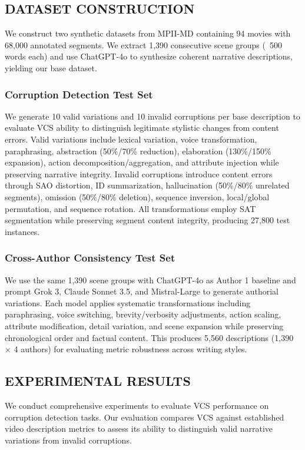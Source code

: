 \documentclass[main.tex]{subfiles}
\begin{document}
\subsection{DATASET CONSTRUCTION}

We construct two synthetic datasets from MPII-MD containing 94 movies with 68,000 annotated segments. We extract 1,390 consecutive scene groups (~500 words each) and use ChatGPT-4o to synthesize coherent narrative descriptions, yielding our base dataset.

\subsubsection{Corruption Detection Test Set}
We generate 10 valid variations and 10 invalid corruptions per base description to evaluate VCS ability to distinguish legitimate stylistic changes from content errors. Valid variations include lexical variation, voice transformation, paraphrasing, abstraction (50\%/70\% reduction), elaboration (130\%/150\% expansion), action decomposition/aggregation, and attribute injection while preserving narrative integrity. Invalid corruptions introduce content errors through SAO distortion, ID summarization, hallucination (50\%/80\% unrelated segments), omission (50\%/80\% deletion), sequence inversion, local/global permutation, and sequence rotation. All transformations employ SAT segmentation while preserving segment content integrity, producing 27,800 test instances.

\subsubsection{Cross-Author Consistency Test Set}
We use the same 1,390 scene groups with ChatGPT-4o as Author 1 baseline and prompt Grok 3, Claude Sonnet 3.5, and Mistral-Large to generate authorial variations. Each model applies systematic transformations including paraphrasing, voice switching, brevity/verbosity adjustments, action scaling, attribute modification, detail variation, and scene expansion while preserving chronological order and factual content. This produces 5,560 descriptions (1,390 × 4 authors) for evaluating metric robustness across writing styles.

\subsection{EXPERIMENTAL RESULTS}

We conduct comprehensive experiments to evaluate VCS performance on corruption detection tasks. Our evaluation compares VCS against established video description metrics to assess its ability to distinguish valid narrative variations from invalid corruptions.
\end{document}
